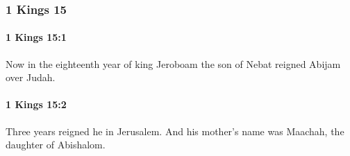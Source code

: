 	\subsubsection{1 Kings 15} %
		\label{1KINGS-15}

		\paragraph{1 Kings 15:1} %
			\label{1KINGS-15-1}

			Now in the eighteenth year of king Jeroboam the son of Nebat reigned Abijam over Judah.


		\paragraph{1 Kings 15:2} %
			\label{1KINGS-15-2}

			Three years reigned he in Jerusalem. And his mother’s name was Maachah, the daughter of Abishalom.

